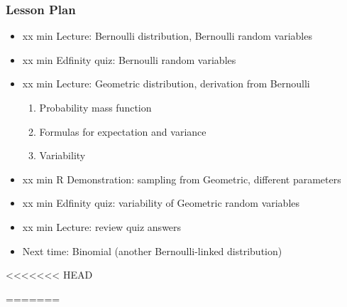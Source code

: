 \begin{frame}
    \frametitle{Lesson Plan}
    \begin{itemize}
        \item xx min Lecture: Bernoulli distribution, Bernoulli random variables
        \item xx min Edfinity quiz: Bernoulli random variables
        \item xx min Lecture: Geometric distribution, derivation from Bernoulli
        \begin{enumerate}
            \item Probability mass function
            \item Formulas for expectation and variance
            \item Variability
        \end{enumerate}
        \item xx min R Demonstration: sampling from Geometric, different parameters
        \item xx min Edfinity quiz: variability of Geometric random variables
        \item xx min Lecture: review quiz answers
        \item Next time: Binomial (another Bernoulli-linked distribution)
    \end{itemize}
<<<<<<< HEAD
\end{frame}

\begin{frame}
=======
    \end{frame}
    
